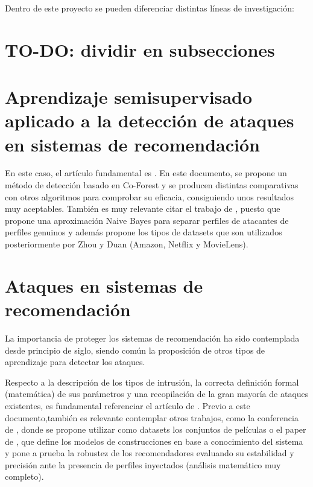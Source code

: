 
Dentro de este proyecto se pueden diferenciar distintas líneas de investigación:

\section{TO-DO: dividir en subsecciones}

\section{Aprendizaje semisupervisado aplicado a la detección de ataques en sistemas de recomendación}

En este caso, el artículo fundamental es \cite{zhou2021SemisupervisedRecommendationAttack}. En este documento, se propone un método de detección basado en Co-Forest y se producen distintas comparativas con otros algoritmos para comprobar su eficacia, consiguiendo unos resultados muy aceptables. También es muy relevante citar el trabajo de \cite{zhiang2012HySADNayveBayes}, puesto que propone una aproximación Naive Bayes para separar perfiles de atacantes de perfiles genuinos y además propone los tipos de datasets que son utilizados posteriormente por Zhou y Duan (Amazon, Netflix y MovieLens).

\section{Ataques en sistemas de recomendación}

La importancia de proteger los sistemas de recomendación ha sido contemplada desde principio de siglo, siendo común la proposición de otros tipos de aprendizaje para detectar los ataques.

Respecto a la descripción de los tipos de intrusión, la correcta definición formal (matemática) de sus parámetros y una recopilación de la gran mayoría de ataques existentes, es fundamental referenciar el artículo de \cite{mingdan2018ShillingAttacksAReview}. Previo a este documento,también es relevante contemplar otros trabajos, como la conferencia de \cite{lam2004ShillingRecommender}, donde se propone utilizar como datasets los conjuntos de películas o el paper de \cite{mahony2004CollaborativeRecommendation}, que define los modelos de construcciones en base a conocimiento del sistema y pone a prueba la robustez de los recomendadores evaluando su estabilidad y precisión ante la presencia de perfiles inyectados (análisis matemático muy completo).